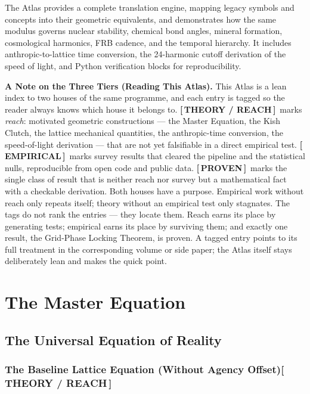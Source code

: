 \documentclass[12pt,oneside]{book}
\newcommand{\TheoryTag}{\;\colorbox{theorytag!15}{\textcolor{theorytag}{\footnotesize\bfseries [\,THEORY / REACH\,]}}}
\newcommand{\EmpiricalTag}{\;\colorbox{empiricaltag!15}{\textcolor{empiricaltag}{\footnotesize\bfseries [\,EMPIRICAL\,]}}}
\newcommand{\ProvenTag}{\;\colorbox{proventag!15}{\textcolor{proventag}{\footnotesize\bfseries [\,PROVEN\,]}}}
\begin{document}
The Atlas provides a complete translation engine, mapping legacy symbols and
concepts into their geometric equivalents, and demonstrates how the same
modulus governs nuclear stability, chemical bond angles, mineral formation,
cosmological harmonics, FRB cadence, and the temporal hierarchy. It includes
anthropic-to-lattice time conversion, the 24-harmonic cutoff derivation of the
speed of light, and Python verification blocks for reproducibility.

\vspace{1em}
\noindent\textbf{\textcolor{kishblue}{A Note on the Three Tiers (Reading This Atlas).}}
This Atlas is a lean index to two houses of the same programme, and each entry is
tagged so the reader always knows which house it belongs to. \TheoryTag\ marks
\emph{reach}: motivated geometric constructions --- the Master Equation, the Kish
Clutch, the lattice mechanical quantities, the anthropic-time conversion, the
speed-of-light derivation --- that are not yet falsifiable in a direct empirical test.
\EmpiricalTag\ marks survey results that cleared the pipeline and the statistical
nulls, reproducible from open code and public data. \ProvenTag\ marks the single class
of result that is neither reach nor survey but a mathematical fact with a checkable
derivation. Both houses have a purpose. Empirical work without reach only repeats
itself; theory without an empirical test only stagnates. The tags do not rank the
entries --- they locate them. Reach earns its place by generating tests; empirical
earns its place by surviving them; and exactly one result, the Grid-Phase Locking
Theorem, is proven. A tagged entry points to its full treatment in the corresponding
volume or side paper; the Atlas itself stays deliberately lean and makes the quick point.

\newpage

\part{The Master Equation}

\chapter{The Universal Equation of Reality}

\section{The Baseline Lattice Equation (Without Agency Offset)\TheoryTag}
\end{document}
